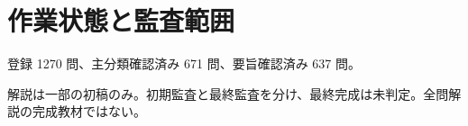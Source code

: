 \chapter{作業状態と監査範囲}
登録 1270 問、主分類確認済み 671 問、要旨確認済み 637 問。
\par 解説は一部の初稿のみ。初期監査と最終監査を分け、最終完成は未判定。全問解説の完成教材ではない。

